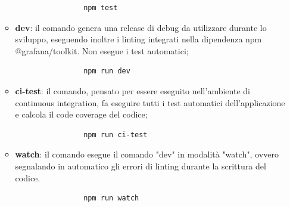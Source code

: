 \begin{itemize}
\begin{itemize}
			\begin{verbatim}
				npm test
			\end{verbatim}
			\item \textbf{dev}: il comando genera una release di debug da utilizzare durante lo sviluppo, eseguendo inoltre i linting integrati nella dipendenza npm @grafana/toolkit. Non esegue i test automatici;
			\begin{verbatim}
				npm run dev
			\end{verbatim}
			\item \textbf{ci-test}: il comando, pensato per essere eseguito nell'ambiente di continuous integration, fa eseguire tutti i test automatici dell'applicazione e calcola il code coverage del codice;
			\begin{verbatim}
				npm run ci-test
			\end{verbatim}
			\item \textbf{watch}: il comando esegue il comando "dev" in modalità "watch", ovvero segnalando in automatico gli errori di linting durante la scrittura del codice.
			\begin{verbatim}
				npm run watch
			\end{verbatim}
		\end{itemize}
\end{itemize}
